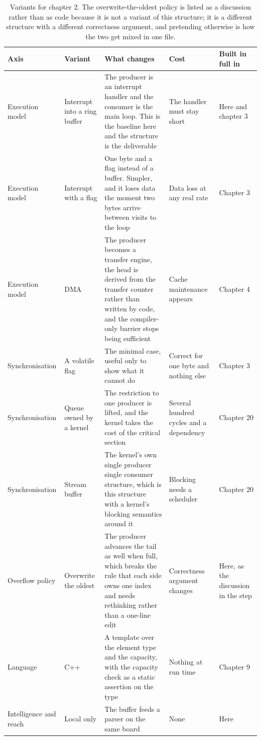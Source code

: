\begin{table}[H]\centering\small
\begin{tabular}{p{24mm}p{26mm}p{44mm}p{22mm}p{20mm}}
\toprule
Axis & Variant & What changes & Cost & Built in full in \\
\midrule
Execution model & Interrupt into a ring buffer & The producer is an interrupt handler and the consumer is the main loop. This is the baseline here and the structure is the deliverable & The handler must stay short & Here and chapter 3 \\
Execution model & Interrupt with a flag & One byte and a flag instead of a buffer. Simpler, and it loses data the moment two bytes arrive between visits to the loop & Data loss at any real rate & Chapter 3 \\
Execution model & DMA & The producer becomes a transfer engine, the head is derived from the transfer counter rather than written by code, and the compiler-only barrier stops being sufficient & Cache maintenance appears & Chapter 4 \\
Synchronisation & A volatile flag & The minimal case, useful only to show what it cannot do & Correct for one byte and nothing else & Chapter 3 \\
Synchronisation & Queue owned by a kernel & The restriction to one producer is lifted, and the kernel takes the cost of the critical section & Several hundred cycles and a dependency & Chapter 20 \\
Synchronisation & Stream buffer & The kernel's own single producer single consumer structure, which is this structure with a kernel's blocking semantics around it & Blocking needs a scheduler & Chapter 20 \\
Overflow policy & Overwrite the oldest & The producer advances the tail as well when full, which breaks the rule that each side owns one index and needs rethinking rather than a one-line edit & Correctness argument changes & Here, as the discussion in the step \\
Language & C++ & A template over the element type and the capacity, with the capacity check as a static assertion on the type & Nothing at run time & Chapter 9 \\
Intelligence and reach & Local only & The buffer feeds a parser on the same board & None & Here \\
\bottomrule
\end{tabular}
\caption{Variants for chapter 2. The overwrite-the-oldest policy is listed as a discussion rather than as code because it is not a variant of this structure; it is a different structure with a different correctness argument, and pretending otherwise is how the two get mixed in one file.}
\end{table}

